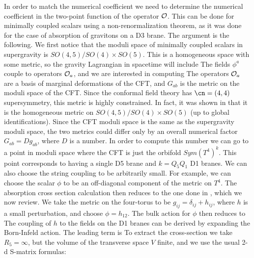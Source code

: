 In order to match the numerical coefficient we
need to determine the numerical coefficient in the two-point
function of the operator ${\cal O}$. 
This can be done for minimally coupled scalars using a 
non-renormalization theorem,  as it was done
for the case of absorption of gravitons on a D3 brane. 
The argument is the following.
We first notice that the moduli space of minimally coupled scalars
in supergravity is  $SO(4,5)/SO(4)\times SO(5)$.
This is a homogeneous space
with some metric, so the gravity Lagrangian in spacetime will include
The fields $\phi^a$ couple to  operators ${\cal O}_a$, and
we are interested in computing
The operators ${\cal O}_a$ are a basis of marginal deformations
of the CFT,
  and  $ G_{ab}$ is the metric
on the moduli space of the CFT. 
Since 
the conformal field theory has $\cn=(4,4)$ supersymmetry, this metric
is highly constrained. In fact, it was shown in  
\cite{Cecotti:1991kz} that it is  the homogeneous metric  on 
$SO(4,5)/SO(4)\times SO(5)$ (up to global identifications). 
Since the CFT moduli space is the same as the supergravity 
moduli space, the two metrics
 could differ only by an overall numerical
factor $G_{ab} = D g_{ab}$, where $D$ is a number. 
In order to compute this number we can go to a point in moduli 
space where the CFT is just the orbifold $Sym(T^4)^k$. 
This point corresponds to having a single D5 brane and $k=Q_5Q_1$ 
D1 branes. We can also choose the string coupling to be arbitrarily 
small. For example, we can choose the scalar $\phi$ to be an off-diagonal 
component of the metric on $T^4$.
The absorption cross section  calculation then reduces to the one  
done in \cite{Das:1996wn}, which we now review. 
We take the metric on the four-torus to be 
$g_{ij} = \delta_{ij} + h_{ij}$, where $h$ is a small perturbation,
and choose $\phi = h_{12}$. 
The bulk action for $\phi$ then reduces to 
The coupling of $h$ to the fields on the D1 branes can be derived
by expanding the Born-Infeld action. The leading term is
To extract the cross-section we take $R_5 = \infty$, but the 
volume of the transverse space $V$ finite, 
and we use the usual 2-d S-matrix formulas:
